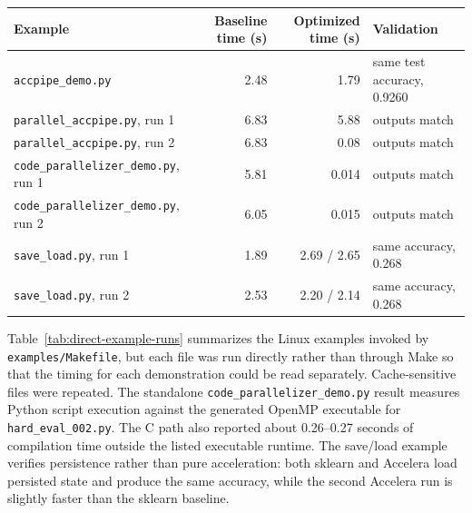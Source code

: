 \documentclass[12pt,a4paper,oneside]{report}
\newcommand{\besttime}{\cellcolor{green!20}}
\begin{document}
\newpage
\begin{center}
\label{tab:direct-example-runs}
\footnotesize
\setlength{\tabcolsep}{3pt}
\renewcommand{\arraystretch}{1.05}
\begin{tabularx}{\textwidth}{p{}rrX}
\toprule
Example & Baseline time (s) & Optimized time (s) & Validation \\
\midrule
\texttt{accpipe\_demo.py} & 2.48 & \besttime 1.79 & same test accuracy, 0.9260 \\
\texttt{parallel\_accpipe.py}, run 1 & 6.83 & \besttime 5.88 & outputs match \\
\texttt{parallel\_accpipe.py}, run 2 & 6.83 & \besttime 0.08 & outputs match \\
\texttt{code\_parallelizer\_demo.py}, run 1 & 5.81 & \besttime 0.014 & outputs match \\
\texttt{code\_parallelizer\_demo.py}, run 2 & 6.05 & \besttime 0.015 & outputs match \\
\texttt{save\_load.py}, run 1 & 1.89 & 2.69 / 2.65 & same accuracy, 0.268 \\
\texttt{save\_load.py}, run 2 & 2.53 & \besttime 2.20 / 2.14 & same accuracy, 0.268 \\
\bottomrule
\end{tabularx}
\end{center}

Table~\ref{tab:direct-example-runs} summarizes the Linux examples invoked by
\texttt{examples/Makefile}, but each file was run directly rather than through
Make so that the timing for each demonstration could be read separately.
Cache-sensitive files were repeated. The standalone
\texttt{code\_parallelizer\_demo.py} result measures Python script execution
against the generated OpenMP executable for \texttt{hard\_eval\_002.py}. The C
path also reported about 0.26--0.27 seconds of compilation time outside the
listed executable runtime. The save/load example verifies persistence rather
than pure acceleration: both sklearn and Accelera load persisted state and
produce the same accuracy, while the second Accelera run is slightly faster
than the sklearn baseline.
\end{document}
